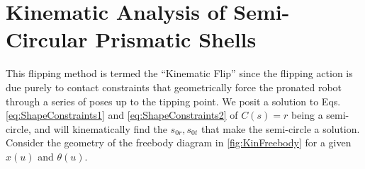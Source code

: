 \documentclass[letterpaper]{report}
\begin{document}

\section{Kinematic Analysis of Semi-Circular Prismatic Shells}
This flipping method is termed the ``Kinematic Flip'' since the flipping action is due purely to contact constraints that geometrically force the pronated robot through a series of poses up to the tipping point.
We posit a solution to Eqs. \ref{eq:ShapeConstraints1} and \ref{eq:ShapeConstraints2} of $C(s) = r$ being a semi-circle, and will kinematically find the $s_{0r}, s_{0t}$ that make the semi-circle a solution.
Consider the geometry of the freebody diagram in \ref{fig:KinFreebody} for a given $x(u)$ and $\theta(u)$.
\end{document}
